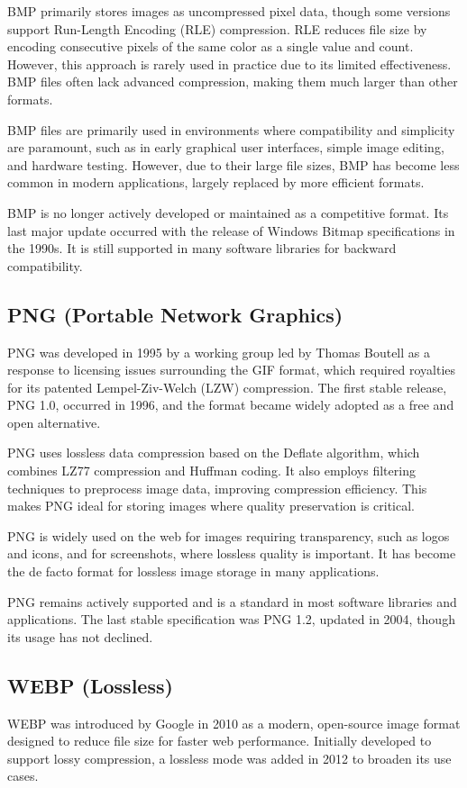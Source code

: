 \documentclass[conference]{IEEEtran}
\begin{document}
BMP primarily stores images as uncompressed pixel data, though some versions support Run-Length Encoding (RLE) compression. RLE reduces file size by encoding consecutive pixels of the same color as a single value and count. However, this approach is rarely used in practice due to its limited effectiveness. BMP files often lack advanced compression, making them much larger than other formats.

BMP files are primarily used in environments where compatibility and simplicity are paramount, such as in early graphical user interfaces, simple image editing, and hardware testing. However, due to their large file sizes, BMP has become less common in modern applications, largely replaced by more efficient formats.

BMP is no longer actively developed or maintained as a competitive format. Its last major update occurred with the release of Windows Bitmap specifications in the 1990s. It is still supported in many software libraries for backward compatibility.

\subsection{PNG (Portable Network Graphics)}
PNG was developed in 1995 by a working group led by Thomas Boutell as a response to licensing issues surrounding the GIF format, which required royalties for its patented Lempel-Ziv-Welch (LZW) compression. The first stable release, PNG 1.0, occurred in 1996, and the format became widely adopted as a free and open alternative.

PNG uses lossless data compression based on the Deflate algorithm, which combines LZ77 compression and Huffman coding. It also employs filtering techniques to preprocess image data, improving compression efficiency. This makes PNG ideal for storing images where quality preservation is critical.

PNG is widely used on the web for images requiring transparency, such as logos and icons, and for screenshots, where lossless quality is important. It has become the de facto format for lossless image storage in many applications.

PNG remains actively supported and is a standard in most software libraries and applications. The last stable specification was PNG 1.2, updated in 2004, though its usage has not declined.

\subsection{WEBP (Lossless)}
WEBP was introduced by Google in 2010 as a modern, open-source image format designed to reduce file size for faster web performance. Initially developed to support lossy compression, a lossless mode was added in 2012 to broaden its use cases.
\end{document}
